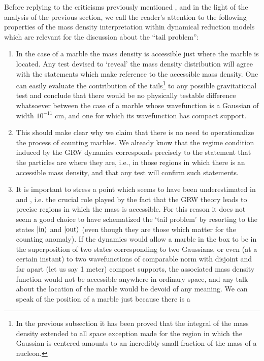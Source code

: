 \documentclass[10pt,a4paper]{article}
\begin{document}
Before replying to the criticisms previously mentioned
\cite{shi90,alo1,lew,cli1,cli2}, and in the light of the analysis
of the previous section, we call the reader's attention to the
following properties of the mass density interpretation within
dynamical reduction models which are relevant for the discussion
about the ``tail problem'':
\begin{enumerate}
\item In the case of a marble the mass density is accessible just
where the marble is located. Any test devised to `reveal' the mass
density distribution will agree with the statements which make
reference to the accessible mass density. One can easily evaluate
the contribution of the tails\footnote{In the previous subsection
it has been proved that the integral of the mass density extended
to all space exception made for the region in which the Gaussian
is centered amounts to an incredibly small fraction of the mass of
a nucleon.} to any possible gravitational test and conclude that
there would be no physically testable difference whatsoever
between the case of a marble whose wavefunction is a Gaussian of
width $10^{-11}$ cm, and one for which its wavefunction has
compact support.
\item This should make clear why we claim that there is no need to
operationalize the process of counting marbles. We already know
that the regime condition induced by the GRW dynamics corresponds
precisely to the statement that the particles are where they are,
i.e., in those regions in which there is an accessible mass
density, and that any test will confirm such statements.
\item It is important to stress a point which seems to have been
underestimated in \cite{cli1} and \cite{cli2}, i.e. the crucial
role played by the fact that the GRW theory leads to precise
regions in which the mass is accessible. For this reason it does
not seem a good choice to have schematized the `tail problem' by
resorting to the states $|\makebox{in}\rangle$ and
$|\makebox{out}\rangle$ (even though they are those which matter
for the counting anomaly). If the dynamics would allow a marble in
the box to be in the superposition of two states corresponding to
two Gaussians, or even (at a certain instant) to two wavefunctions
of comparable norm with disjoint and far apart (let us say 1
meter) compact supports, the associated mass density function
would not be accessible anywhere in ordinary space, and any talk
about the location of the marble would be devoid of any meaning.
We can speak of the position of a marble just because there is a

\end{enumerate}
\end{document}
